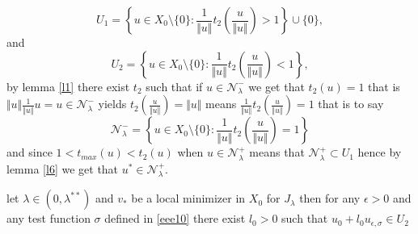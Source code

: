 \documentclass[10pt,twoside,reqno,centertags,draft]{amsart}
\begin{document}
\begin{equation*}
U_1 =\left\lbrace u \in X_0\setminus\{ 0\}: \frac{1}{\Vert u\Vert} t_{2}\left(\frac{u}{\Vert u\Vert}\right) > 1\right\rbrace \cup \{ 0\},
\end{equation*}
and
\begin{equation*}
U_2 =\left\lbrace u \in X_0\setminus\{ 0\}: \frac{1}{\Vert u\Vert} t_{2}\left(\frac{u}{\Vert u\Vert}\right) < 1\right\rbrace,
\end{equation*}
by lemma \ref{l1} there exist $ t_2$ such that if $ u \in \mathcal{N}_{\lambda}^{-}$ we get that $ t_2(u) =1$ that is 
$ \Vert u\Vert \frac{1}{\Vert u\Vert} u =u \in \mathcal{N}_{\lambda}^{-}$ yields $ t_2(\frac{u}{\Vert u\Vert}) =\Vert u\Vert$ means $ \frac{1}{\Vert u\Vert} t_2(\frac{u}{\Vert u\Vert}) =1$ that is to say
\begin{equation*}
\mathcal{N}_{\lambda}^{-} =\left\lbrace u \in X_0\setminus\{ 0\}: \frac{1}{\Vert u\Vert} t_{2}\left(\frac{u}{\Vert u\Vert}\right) = 1\right\rbrace
\end{equation*}
and since $ 1 < t_{max}(u) <t_{2}(u)$ when $ u \in \mathcal{N}_{\lambda}^{+}$ means that $ \mathcal{N}_{\lambda}^{+} \subset U_1$ hence by lemma \ref{l6} 
we get that $ u^* \in \mathcal{N}_{\lambda}^{+}.$
\begin{lemma}\label{l9}
let $ \lambda \in (0 ,\lambda^{**})$ and $ v_*$ be a local minimizer in $ X_0$ for $ J_{\lambda}$ then for any $\epsilon >0 $ and any test function $ \sigma$ defined in \ref{eee10} there exist $ l_0 >0$ such that $ u_0 +l_0u_{\epsilon,\sigma} \in U_2$  
\end{lemma}
\end{document}
